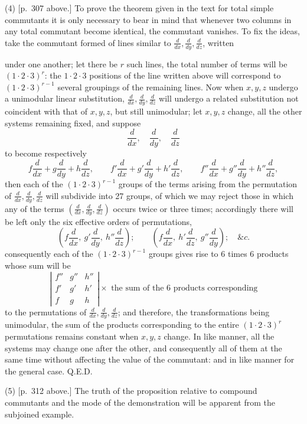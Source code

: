 \documentclass[11pt]{article}
\newcommand{\sourcepage}[1]{\marginpar{\scriptsize p.~#1}}
\begin{document}
{{(4) [p.~307 above.] To prove the theorem given in the text for total simple commutants it is only necessary to bear in mind that whenever two columns in any total commutant become identical, the commutant vanishes. To fix the ideas, take the commutant formed of lines similar to $\frac{d}{dx},\frac{d}{dy},\frac{d}{dz}$, written

\sourcepage{324}
under one another; let there be $r$ such lines, the total number of terms will be $(1\cdot2\cdot3)^r$: the $1\cdot2\cdot3$ positions of the line written above will correspond to $(1\cdot2\cdot3)^{r-1}$ several groupings of the remaining lines. Now when $x,y,z$ undergo a unimodular linear substitution, $\frac{d}{dx},\frac{d}{dy},\frac{d}{dz}$ will undergo a related substitution not coincident with that of $x,y,z$, but still unimodular; let $x,y,z$ change, all the other systems remaining fixed, and suppose
\[
\frac{d}{dx},\quad\frac{d}{dy},\quad\frac{d}{dz}
\]
to become respectively
\[
f\frac{d}{dx}+g\frac{d}{dy}+h\frac{d}{dz},\qquad
f'\frac{d}{dx}+g'\frac{d}{dy}+h'\frac{d}{dz},\qquad
f''\frac{d}{dx}+g''\frac{d}{dy}+h''\frac{d}{dz},
\]
then each of the $(1\cdot2\cdot3)^{r-1}$ groups of the terms arising from the permutation of $\frac{d}{dx},\frac{d}{dy},\frac{d}{dz}$ will subdivide into 27 groups, of which we may reject those in which any of the terms $\left(\frac{d}{dx},\frac{d}{dy},\frac{d}{dz}\right)$ occurs twice or three times; accordingly there will be left only the six effective orders of permutations,
\[
\left(f\frac{d}{dx},\ g'\frac{d}{dy},\ h''\frac{d}{dz}\right);\qquad
\left(f\frac{d}{dx},\ h'\frac{d}{dz},\ g''\frac{d}{dy}\right);\quad \&c.
\]
consequently each of the $(1\cdot2\cdot3)^{r-1}$ groups gives rise to 6 times 6 products whose sum will be
\[
\left|\begin{array}{ccc}
f''&g''&h''\\
f'&g'&h'\\
f&g&h
\end{array}\right|
\times \text{ the sum of the 6 products corresponding}
\]
to the permutations of $\frac{d}{dx},\frac{d}{dy},\frac{d}{dz}$; and therefore, the transformations being unimodular, the sum of the products corresponding to the entire $(1\cdot2\cdot3)^r$ permutations remains constant when $x,y,z$ change. In like manner, all the systems may change one after the other, and consequently all of them at the same time without affecting the value of the commutant: and in like manner for the general case. \hfill Q.E.D.

(5) [p.~312 above.] The truth of the proposition relative to compound commutants and the mode of the demonstration will be apparent from the subjoined example.

}}
\end{document}
